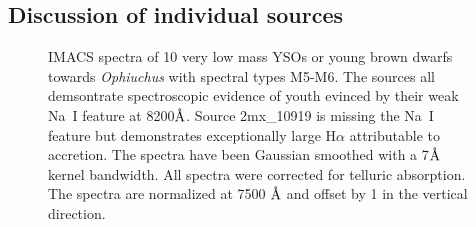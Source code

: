 \begin{landscape}
	
\end{landscape}

\subsection{Discussion of individual sources}
\label{sec_individual_sources}

\begin{figure}[ht!]
\caption[IMACS spectra of 10 very low mass YSOs or young brown dwarfs towards \emph{Ophiuchus} with spectral types M5-M6]{IMACS spectra of 10 very low mass YSOs or young brown dwarfs towards \emph{Ophiuchus} with spectral types M5-M6.  The sources all demsontrate spectroscopic evidence of youth evinced by their weak Na~I feature at 8200$\mbox{\normalfont\AA}$.  Source 2mx\_10919 is missing the Na~I feature but demonstrates exceptionally large H$\alpha$ attributable to accretion.  The spectra have been Gaussian smoothed with a 7$\mbox{\normalfont\AA}$ kernel bandwidth.  All spectra were corrected for telluric absorption.  The spectra are normalized at 7500 $\mbox{\normalfont\AA}$ and offset by 1 in the vertical direction. \label{fig_IMACS_spectra1} }
\centering

\end{figure}
